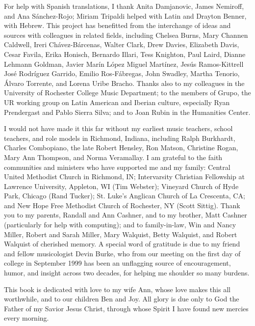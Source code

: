 For help with Spanish translations, I thank Anita Damjanovic, James Nemiroff,
and Ana Sánchez-Rojo; Miriam Tripaldi helped with Latin and Drayton Benner,
with Hebrew.
This project has benefitted from the interchange of ideas and sources with
colleagues in related fields, including 
Chelsea Burns,
Mary Channen Caldwell,
Ireri Chávez-Bárcenas,
Walter Clark,
Drew Davies,
Elizabeth Davis,
Cesar Favila,
Erika Honisch,
Bernardo Illari,
Tess Knighton,
Paul Laird,
Dianne Lehmann Goldman,
Javier Marín López
Miguel Martínez, 
Jesús Ramos-Kittrell
José Rodríguez Garrido, 
Emilio Ros-Fábregas, 
John Swadley,
Martha Tenorio, 
Álvaro Torrente,
and 
Lorena Uribe Bracho.
Thanks also to my colleagues in the University of Rochester College Music
Department; to the members of Grupo, the UR working group on Latin American
and Iberian culture, especially Ryan Prendergast and Pablo Sierra
Silva; and to Joan Rubin in the Humanities Center.

I would not have made it this far without my earliest music teachers, school
teachers, and role models in Richmond, Indiana, including 
Ralph Burkhardt, 
Charles Combopiano, 
the late Robert Hensley, 
Ron Matson, 
Christine Rogan, 
Mary Ann Thompson,
and 
Norma Veramallay.
I am grateful to the faith communities and ministers who have supported me and
my family:
Central United Methodist Church in Richmond, IN; 
Intervarsity Christian Fellowship at Lawrence University, Appleton, WI (Tim
Webster); 
Vineyard Church of Hyde Park, Chicago (Rand Tucker); 
St. Luke's Anglican Church of La Crescenta, CA; 
and New Hope Free Methodist Church of Rochester, NY (Scott Sittig).
Thank you to my parents, Randall and Ann Cashner, and to
my brother, Matt Cashner (particularly for help with computing); and to
family-in-law, Win and Nancy Miller, Robert and Sarah Miller, Mary Walquist,
Betty Walquist, and Robert Walquist of cherished memory.
A special word of gratitude is due to my friend and fellow musicologist Devin
Burke, who from our meeting on the first day of college in September 1999 has
been an unflagging source of encouragement, humor, and insight across two
decades, for helping me shoulder so many burdens.

This book is dedicated with love to my wife Ann, whose love makes this all
worthwhile, and to our children Ben and Joy.
All glory is due only to God the Father of my Savior Jesus Christ, through
whose Spirit I have found new mercies every morning.

\endinput
